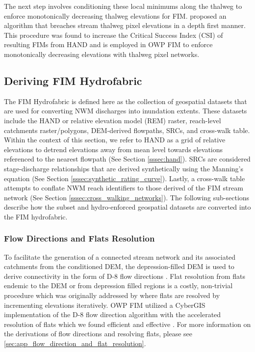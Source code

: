 The next step involves conditioning these local minimums along the thalweg to enforce monotonically decreasing thalweg elevations for FIM.
 proposed an algorithm that breaches stream thalweg pixel elevations in a depth first manner. 
This procedure was found to increase the Critical Success Index (CSI) of resulting FIMs from HAND and is employed in OWP FIM to enforce monotonically decreasing elevations with thalweg pixel networks.
%
\subsection{Deriving FIM Hydrofabric}
\label{ssec:deriving_fim_hydrofabric}
%
The FIM Hydrofabric is defined here as the collection of geospatial datasets that are used for converting NWM discharges into inundation extents.
These datasets include the HAND or relative elevation model (REM) raster, reach-level catchments raster/polygons, DEM-derived flowpaths, SRCs, and cross-walk table.
Within the context of this section, we refer to HAND as a grid of relative elevations to detrend elevations away from mean level towards elevations referenced to the nearest flowpath (See Section \ref{sssec:hand}).
SRCs are considered stage-discharge relationships that are derived synthetically using the Manning's equation (See Section \ref{sssec:synthetic_rating_curve}).
Lastly, a cross-walk table attempts to conflate NWM reach identifiers to those derived of the FIM stream network (See Section \ref{sssec:cross_walking_networks}).
The following sub-sections describe how the subset and hydro-enforced geospatial datasets are converted into the FIM hydrofabric.
%
\subsubsection{Flow Directions and Flats Resolution}
\label{ssec:flow_direction_and_flat_resolution}
%
To facilitate the generation of a connected stream network and its associated catchments from the conditioned DEM, the depression-filled DEM is used to derive connectivity in the form of D-8 flow directions \cite{o1984extraction}.
Flat resolution from flats endemic to the DEM or from depression filled regions is a costly, non-trivial procedure which was originally addressed by  where flats are resolved by incrementing elevations iteratively.
OWP FIM utilized a CyberGIS implementation of the D-8 flow direction algorithm with the accelerated resolution of flats which we found efficient and effective \cite{survila2016scalable,cybergis2016}.
For more information on the derivations of flow directions and resolving flats, please see \ref{sec:app_flow_direction_and_flat_resolution}.
%

